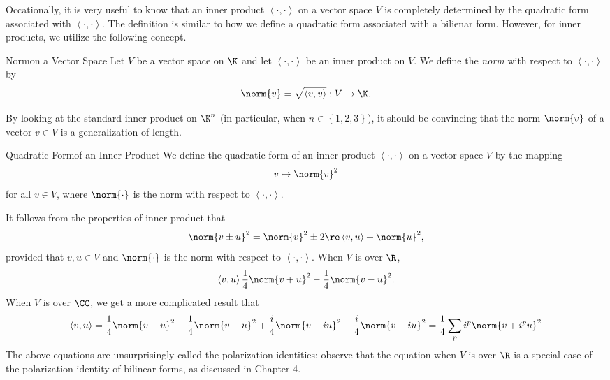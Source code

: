 \documentclass[linearalgebra]{subfiles}
\begin{document}
    \begin{remark}
        Occationally, it is very useful to know that an inner product $\left\langle \cdot, \cdot\right\rangle$ on a vector space $V$ is completely determined by the quadratic form associated with $\left\langle \cdot, \cdot\right\rangle$. The definition is similar to how we define a quadratic form associated with a bilienar form. However, for inner products, we utilize the following concept.
    \end{remark}

    \begin{definition}{Norm}{on a Vector Space}
        Let $V$ be a vector space on $\K$ and let $\left\langle \cdot, \cdot\right\rangle$ be an inner product on $V$. We define the \emph{norm} with respect to $\left\langle \cdot, \cdot\right\rangle$ by
        \begin{equation*}
            \norm{v} = \sqrt{\left\langle v, v\right\rangle } : V\to \K.
        \end{equation*}
    \end{definition}

    \noindent By looking at the standard inner product on $\K^n$ (in particular, when $n\in\left\lbrace 1,2,3 \right\rbrace$), it should be convincing that the norm $\norm{v}$ of a vector $v\in V$ is a generalization of length.

    \begin{definition}{Quadratic Form}{of an Inner Product}
        We define the quadratic form of an inner product $\left\langle \cdot, \cdot\right\rangle$ on a vector space $V$ by the mapping
        \begin{equation*}
            v\mapsto\norm{v}^2
        \end{equation*}
        for all $v\in V$, where $\norm{\cdot}$ is the norm with respect to $\left\langle \cdot, \cdot\right\rangle$.
    \end{definition}

    \noindent It follows from the properties of inner product that 
    \begin{equation*}
        \norm{v\pm u}^2 = \norm{v}^2\pm 2\re\left\langle v, u\right\rangle + \norm{u}^2,
    \end{equation*}
    provided that $v,u\in V$ and $\norm{\cdot}$ is the norm with respect to $\left\langle \cdot, \cdot\right\rangle$. When $V$ is over $\R$,
    \begin{equation*}
        \left\langle v, u\right\rangle \frac{1}{4}\norm{v+u}^2 - \frac{1}{4}\norm{v-u}^2.
    \end{equation*}
    When $V$ is over $\CC$, we get a more complicated result that
    \begin{equation*}
        \left\langle v, u\right\rangle = \frac{1}{4}\norm{v+u}^2 - \frac{1}{4}\norm{v-u}^2 + \frac{i}{4}\norm{v+iu}^2 - \frac{i}{4}\norm{v-iu}^2 =\frac{1}{4} \sum^{}_{p} i^p\norm{v+i^pu}^2
    \end{equation*}
    The above equations are unsurprisingly called the polarization identities; observe that the equation when $V$ is over $\R$ is a special case of the polarization identity of bilinear forms, as discussed in Chapter 4.
\end{document}
